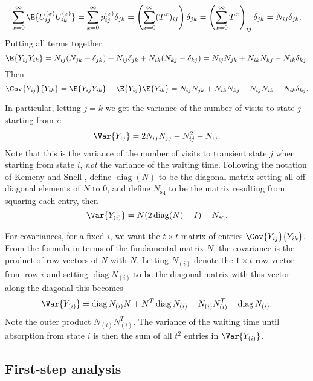 \documentclass[12pt]{article}
\begin{document}
\[
    \sum\limits_{x=0}^{\infty} \E{U_{ij}^{(x)} U_{ik}^{(x)}} = \sum\limits_{x=0}^
    {\infty} p_{ij}^{(x)} \delta_{jk} = \left( \sum\limits_{x=0}^{\infty} (T^
    {x}){}_{ij} \right) \delta_{jk} = \left( \sum\limits_{x=0}^{\infty}
    T^{x} \right)_{ij} \delta_{jk} = N_{ij} \delta_{jk}.
\] Putting all terms together
\[
    \E{Y_{ij} Y_{ik}} = N_{ij}(N_{jk}-\delta_{jk}) + N_{ij} \delta_{jk}
    + N_{ik}(N_{kj}-\delta_{kj}) = N_{ij}N_{jk} + N_{ik}N_{kj} - N_{ik}\delta_
    {kj}.
\] Then
\begin{equation}
    \Cov{Y_{ij}}{Y_{ik}} = \E{Y_{ij} Y_{ik}} - \E{Y_{ij}} \E{Y_{ik}} = N_
    {ij}N_{jk} + N_{ik}N_{kj} - N_{ij}N_{ik} - N_{ik}\delta_{kj}.
     \label{eq:newwaitingtime:cov}
\end{equation}


In particular, letting \( j=k \) we get the variance of the number of
visits to state \( j \) starting from \( i \):
\[
    \Var{Y_{ij}} = 2 N_{ij}N_{jj} - N_{ij}^2 - N_{ij}.
\]  Note that this is the variance of the number of visits to transient
state \( j \) when starting from state \( i \), \emph{not} the variance of
the waiting time.
Following the notation of Kemeny and Snell \cite[page 49]{kemeny60}, define \(
\operatorname{diag}(N) \) to be the diagonal matrix setting all
off-diagonal elements of \( N \) to \( 0 \), and define \( N_{\text{sq}}
\) to be the matrix resulting from squaring each entry, then
\[
    \Var{Y_{(i)}} = N(2
    \operatorname{diag}
    (N) - I) - N_{\text{sq}}.
\]

For covariances, for a fixed \( i \), we want the \( t \times t \)
matrix of entries \( \Cov{Y_{ij}}{ Y_{ik}} \).  From the formula in terms
of the fundamental matrix \( N \), the covariance is the product of row
vectors of \( N \) with \( N \).  Letting \( N_{(i)} \) denote the \( 1
\times t \) row-vector from row \( i \) and setting \( \operatorname{diag}
    N_{(i)} \) to be the diagonal matrix with this vector along the
    diagonal this becomes
\[
    \Var{Y_{(i)}} =
    \operatorname{diag}
    {N_{(i)}} N + N^T
    \operatorname{diag}
    {N_{(i)}} - N_{(i)} N_{(i)}^T -
    \operatorname{diag}
    N_{(i)}.
\]  Note the outer product \( N_{(i)} N_{(i)}^T \).
The variance of the waiting time until absorption from state \( i \)
is then the sum of all \( t^2 \) entries in \( \Var{Y_{(i)}} \).

\subsection*{First-step analysis}
\end{document}
